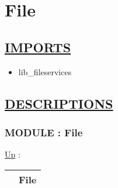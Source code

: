 \chapter*{File}
\hypertarget{ecldoc:toc:File}{}

\section*{\underline{IMPORTS}}
\begin{itemize}
\item lib\_fileservices
\end{itemize}

\section*{\underline{DESCRIPTIONS}}
\subsection*{MODULE : File}
\hypertarget{ecldoc:File}{}
\hyperlink{ecldoc:toc:root}{Up} :

{\renewcommand{\arraystretch}{1.5}
\begin{tabularx}{\textwidth}{|>{\raggedright\arraybackslash}l|X|}
\hline
\hspace{0pt} & File \\
\hline
\end{tabularx}
}

\par



